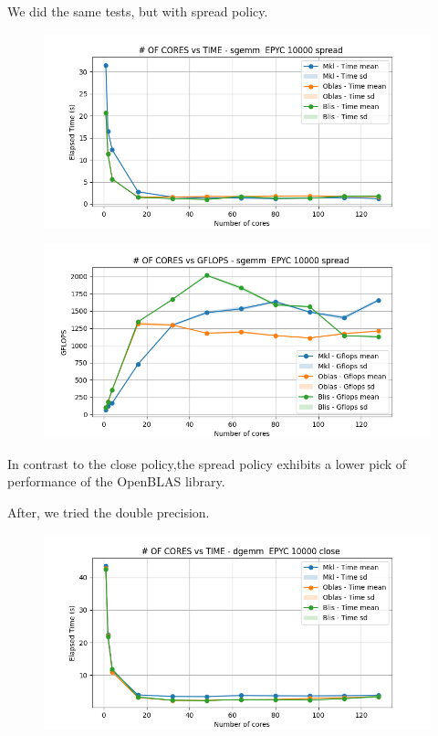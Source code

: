 \documentclass{article}
\begin{document}
We did the same tests, but with spread policy.
\begin{figure}[H]
    \centering
    \includegraphics[width=\textwidth]{EPYC scalability/sgemm__EPYC_10000_spread_time.png}
\end{figure}

\begin{figure}[H]
    \centering
    \includegraphics[width=\textwidth]{EPYC scalability/sgemm__EPYC_10000_spread_gflops.png}
\end{figure}
In contrast to the close policy,the spread policy exhibits a lower pick of performance of the OpenBLAS library. 

After, we tried the double precision.
\begin{figure}[H]
    \centering
    \includegraphics[width=\textwidth]{EPYC scalability/dgemm__EPYC_10000_close_time.png}
\end{figure}
\end{document}
